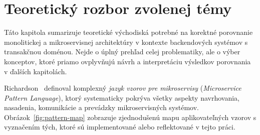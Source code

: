 \chapter{Teoretický rozbor zvolenej témy}\label{ch:theoretical}

Táto kapitola sumarizuje teoretické východiská potrebné na korektné porovnanie monolitickej a mikroservisnej architektúry v kontexte backendových systémov s transakčnou doménou. Nejde o úplný prehľad celej problematiky, ale o výber konceptov, ktoré priamo ovplyvňujú návrh a interpretáciu výsledkov porovnania v ďalších kapitolách.

Richardson~\cite{Richardson2018} definoval komplexný \emph{jazyk vzorov pre mikroservisy} (\emph{Microservice Pattern Language}), ktorý systematicky pokrýva všetky aspekty navrhovania, nasadenia, komunikácie a prevádzky mikroservisných systémov. Obrázok~\ref{fig:pattern-map} zobrazuje zjednodušenú mapu aplikovateľných vzorov s vyznačením tých, ktoré sú implementované alebo reflektované v tejto práci.


